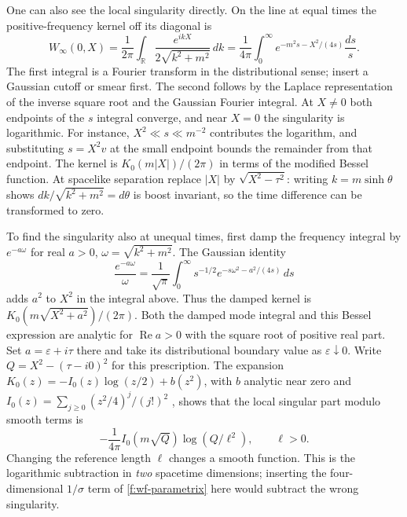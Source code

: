 One can also see the local singularity directly. On the line at equal times the positive-frequency kernel off its diagonal is
\[
 W_\infty(0,X)=\frac1{2\pi}\int_{\mathbb R}\frac{e^{ikX}}{2\sqrt{k^2+m^2}}\,dk
   =\frac1{4\pi}\int_0^\infty e^{-m^2s-X^2/(4s)}\frac{ds}{s} .
\]
The first integral is a Fourier transform in the distributional sense; insert a Gaussian cutoff or smear first. The second follows by the Laplace representation of the inverse square root and the Gaussian Fourier integral. At $X\ne0$ both endpoints of the $s$ integral converge, and near $X=0$ the singularity is logarithmic. For instance, $X^2\ll s\ll m^{-2}$ contributes the logarithm, and substituting $s=X^2 v$ at the small endpoint bounds the remainder from that endpoint. The kernel is $K_0(m|X|)/(2\pi)$ in terms of the modified Bessel function. At spacelike separation replace $|X|$ by $\sqrt{X^2-\tau^2}$: writing $k=m\sinh\theta$ shows $dk/\sqrt{k^2+m^2}=d\theta$ is boost invariant, so the time difference can be transformed to zero.

To find the singularity also at unequal times, first damp the frequency integral by $e^{-a\omega}$ for real $a>0$, $\omega=\sqrt{k^2+m^2}$. The Gaussian identity
\[
 \frac{e^{-a\omega}}{\omega}=\frac1{\sqrt\pi}\int_0^\infty s^{-1/2}e^{-s\omega^2-a^2/(4s)}\,ds
\]
adds $a^2$ to $X^2$ in the integral above. Thus the damped kernel is $K_0(m\sqrt{X^2+a^2})/(2\pi)$. Both the damped mode integral and this Bessel expression are analytic for $\operatorname{Re}a>0$ with the square root of positive real part. Set $a=\varepsilon+i\tau$ there and take its distributional boundary value as $\varepsilon\downarrow0$. Write $Q=X^2-(\tau-i0)^2$ for this prescription. The expansion $K_0(z)=-I_0(z)\log(z/2)+b(z^2)$, with $b$ analytic near zero and $I_0(z)=\sum_{j\ge0}(z^2/4)^j/(j!)^2$ \cite[Eq.~10.31.2]{DLMF}, shows that the local singular part modulo smooth terms is
\begin{equation}
 -\frac{1}{4\pi}I_0(m\sqrt Q)\log(Q/\ell^2),\qquad \ell>0 .\label{f:circle-subtraction}
\end{equation}
Changing the reference length $\ell$ changes a smooth function. This is the logarithmic subtraction in \emph{two} spacetime dimensions; inserting the four-dimensional $1/\sigma$ term of \eqref{f:wf-parametrix} here would subtract the wrong singularity.

